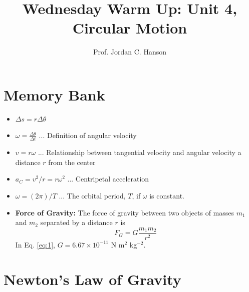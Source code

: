 \documentclass{article}
\begin{document}
\twocolumn

\title{Wednesday Warm Up: Unit 4, Circular Motion}
\author{Prof. Jordan C. Hanson}

\maketitle

\section{Memory Bank}

\begin{itemize}
\item $\Delta s = r \Delta \theta$
\item $\omega = \frac{\Delta \theta}{\Delta t}$ ... Definition of angular velocity
\item $v = r\omega $ ... Relationship between tangential velocity and angular velocity a distance $r$ from the center
\item $a_C = v^2/r = r \omega^2$ ... Centripetal acceleration\
\item $\omega = (2\pi)/T$ ... The orbital period, $T$, if $\omega$ is constant.
\item \textbf{Force of Gravity:} The force of gravity between two objects of masses $m_1$ and $m_2$ separated by a distance $r$ is
\begin{equation}
F_G = G \frac{m_1 m_2}{r^2} \label{eq:1}
\end{equation}
In Eq. \ref{eq:1}, $G = 6.67 \times 10^{-11}$ N m$^{2}$ kg$^{-2}$.
\end{itemize}

\section{Newton's Law of Gravity}
\end{document}

